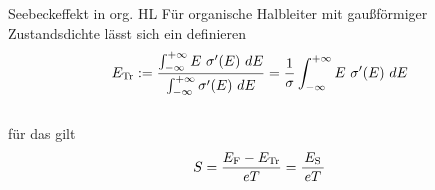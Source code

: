 \begin{frame}{Seebeckeffekt in org. HL}%
Für organische Halbleiter mit gaußförmiger Zustandsdichte lässt sich ein \Et definieren
\vspace*{4ex}
\begin{equation*}
\Et :=  \frac
{ \int_{-\infty} ^{+\infty} E ~ \c'(E) ~ dE }
{ \int_{-\infty} ^{+\infty} \c'(E) ~ dE } 
= \frac{1}{\c} \int_{-\infty} ^{+\infty} E  ~ \c'(E) ~ dE
\end{equation*}
\\\vspace*{2.5ex}
für das gilt
\vspace*{3ex}
\begin{equation*}
\S = \frac{\Ef-\Et}{e T} = \frac{\,\Es\,}{e T} %
\end{equation*}
\end{frame}

